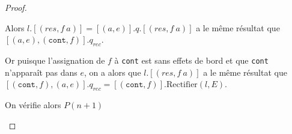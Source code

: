 \begin{proof}
\begin{itemize}
\begin{itemize}
                        \bigskip

                        Alors $l.[(res, f\ a)] = [(a, e)].q.[(res, f\ a)]$ a le
                        même résultat que \\
                        $[(a, e), (\texttt{cont}, f)].q_{rec}$.

                        \bigskip

                        Or puisque l'assignation de $f$ à \texttt{cont} est sans
                        effets de bord et que \texttt{cont} n'apparaît pas dans
                        $e$, on a alors que $l.[(res, f\ a)]$ a le même résultat
                        que $[(\texttt{cont}, f), (a, e)].q_{rec} = [(\texttt{cont}, f)].\text{Rectifier}(l, E)$.

                        \bigskip

                        On vérifie alors $P(n + 1)$
              \end{itemize}


    \end{itemize}
\end{proof}
